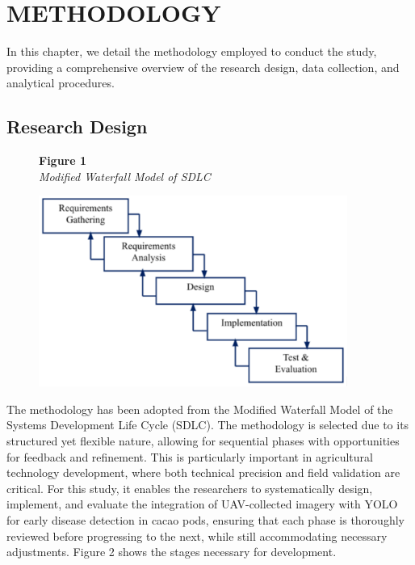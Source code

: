 \chapter{METHODOLOGY}

	In this chapter, we detail the methodology employed to conduct the study, providing a comprehensive overview of the research design, data collection, and analytical procedures.
	
	\section{Research Design}
	
	\begin{figure}[H]
		\raggedright
		\textbf{Figure 1} \\ %
		\textit{Modified Waterfall Model of SDLC} %
		
		\vspace{0.5em}
		\centering
		\includegraphics[width=0.9\textwidth]{figures/waterfall.pdf} %
		
		\vspace{0.5em}
		\raggedright
		
		\label{fig:waterfall}
	\end{figure}
	
	The methodology has been adopted from the Modified Waterfall Model of the Systems Development Life Cycle (SDLC). The methodology is selected due to its structured yet flexible nature, allowing for sequential phases with opportunities for feedback and refinement. This is particularly important in agricultural technology development, where both technical precision and field validation are critical. For this study, it enables the researchers to systematically design, implement, and evaluate the integration of UAV-collected imagery with YOLO for early disease detection in cacao pods, ensuring that each phase is thoroughly reviewed before progressing to the next, while still accommodating necessary adjustments. Figure 2 shows the stages necessary for development.
	
